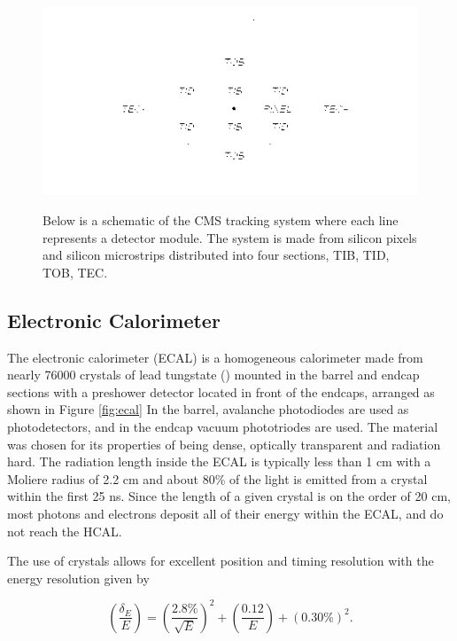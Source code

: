 \begin{figure}[tb]
\caption[The CMS Tracking System]{
 Below is a schematic of the CMS tracking system
  where each line represents a detector module.
 The system is made from silicon pixels and
  silicon microstrips distributed into four sections,
  TIB, TID, TOB, TEC.
 }
\includegraphics[width=\textwidth]{pdfs/experiment/cms_tracker.pdf}
\label{fig:tracker}
\end{figure}
 

 \subsection{Electronic Calorimeter}

The electronic calorimeter (ECAL) is a homogeneous
 calorimeter made from nearly 76000 crystals of lead tungstate (\pbw)
 mounted in the barrel and endcap sections with a 
 preshower detector located in front of the endcaps,
 arranged as shown in Figure \ref{fig:ecal}
In the barrel, avalanche photodiodes are used as photodetectors, 
 and in the endcap vacuum phototriodes are used. 
The material \pbw was chosen for its properties of being
 dense, optically transparent and radiation hard. 
The radiation length inside the ECAL is typically less than 1 cm
 with a Moliere radius of 2.2 cm and about 80\% of the
 light is emitted from a crystal within the first 25 ns.
Since the length of a given crystal is on the order of 20 cm,
 most photons and electrons deposit all of their energy 
 within the ECAL, and do not reach the HCAL.

The use of \pbw crystals allows for excellent position and timing resolution
 with the energy resolution given by 

\begin{equation}\label{eq:ecal_res}
 \left(\frac{\delta_E}{E}\right) =  \left(\frac{2.8\%}{\sqrt{E}}\right)^2 + \left(\frac{0.12}{E}\right) + (0.30\%)^2 .
\end{equation}
 
